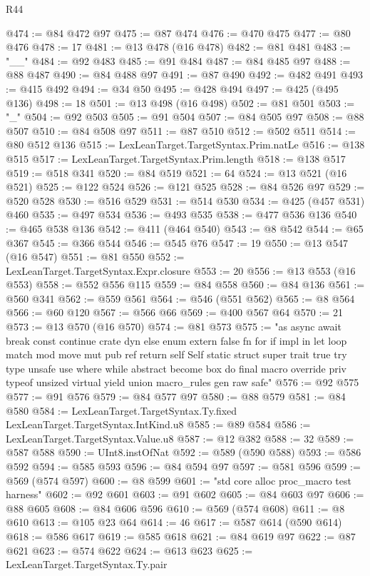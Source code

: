 \begin{lexlean}{R44}
\begin{coremodule}
@474 := @84 @472 @97
@475 := @87 @474
@476 := @470 @475
@477 := @80 @476
@478 := 17
@481 := @13 @478 (@16 @478)
@482 := @81 @481
@483 := "__"
@484 := @92 @483
@485 := @91 @484
@487 := @84 @485 @97
@488 := @88 @487
@490 := @84 @488 @97
@491 := @87 @490
@492 := @482 @491
@493 := @415 @492
@494 := @34 @50
@495 := @428 @494
@497 := @425 (@495 @136)
@498 := 18
@501 := @13 @498 (@16 @498)
@502 := @81 @501
@503 := "_"
@504 := @92 @503
@505 := @91 @504
@507 := @84 @505 @97
@508 := @88 @507
@510 := @84 @508 @97
@511 := @87 @510
@512 := @502 @511
@514 := @80 @512 @136
@515 := LexLeanTarget.TargetSyntax.Prim.natLe
@516 := @138 @515
@517 := LexLeanTarget.TargetSyntax.Prim.length
@518 := @138 @517
@519 := @518 @341
@520 := @84 @519
@521 := 64
@524 := @13 @521 (@16 @521)
@525 := @122 @524
@526 := @121 @525
@528 := @84 @526 @97
@529 := @520 @528
@530 := @516 @529
@531 := @514 @530
@534 := @425 (@457 @531) @460
@535 := @497 @534
@536 := @493 @535
@538 := @477 @536 @136
@540 := @465 @538 @136
@542 := @411 (@464 @540)
@543 := @8 @542
@544 := @65 @367
@545 := @366 @544
@546 := @545 @76
@547 := 19
@550 := @13 @547 (@16 @547)
@551 := @81 @550
@552 := LexLeanTarget.TargetSyntax.Expr.closure
@553 := 20
@556 := @13 @553 (@16 @553)
@558 := @552 @556 @115
@559 := @84 @558
@560 := @84 @136
@561 := @560 @341
@562 := @559 @561
@564 := @546 (@551 @562)
@565 := @8 @564
@566 := @60 @120
@567 := @566 @66
@569 := @400 @567 @64
@570 := 21
@573 := @13 @570 (@16 @570)
@574 := @81 @573
@575 := "as async await break const continue crate dyn else enum extern false fn for if impl in let loop match mod move mut pub ref return self Self static struct super trait true try type unsafe use where while abstract become box do final macro override priv typeof unsized virtual yield union macro_rules gen raw safe"
@576 := @92 @575
@577 := @91 @576
@579 := @84 @577 @97
@580 := @88 @579
@581 := @84 @580
@584 := LexLeanTarget.TargetSyntax.Ty.fixed LexLeanTarget.TargetSyntax.IntKind.u8
@585 := @89 @584
@586 := LexLeanTarget.TargetSyntax.Value.u8
@587 := @12 @382
@588 := 32
@589 := @587 @588
@590 := UInt8.instOfNat
@592 := @589 (@590 @588)
@593 := @586 @592
@594 := @585 @593
@596 := @84 @594 @97
@597 := @581 @596
@599 := @569 (@574 @597)
@600 := @8 @599
@601 := "std core alloc proc_macro test harness"
@602 := @92 @601
@603 := @91 @602
@605 := @84 @603 @97
@606 := @88 @605
@608 := @84 @606 @596
@610 := @569 (@574 @608)
@611 := @8 @610
@613 := @105 @23 @64
@614 := 46
@617 := @587 @614 (@590 @614)
@618 := @586 @617
@619 := @585 @618
@621 := @84 @619 @97
@622 := @87 @621
@623 := @574 @622
@624 := @613 @623
@625 := LexLeanTarget.TargetSyntax.Ty.pair

\end{coremodule}
\end{lexlean}
